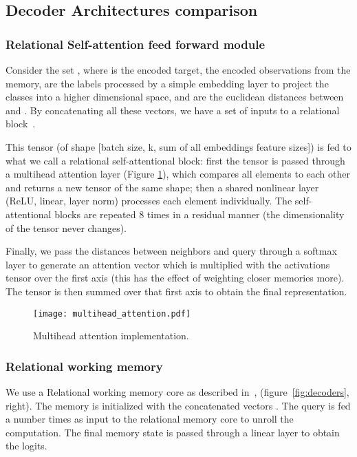 \documentclass{article} \usepackage{iclr2019_conference,times}
\begin{document}
\subsection{Decoder Architectures comparison}
\label{sec:dec_arch}

\subsubsection{Relational Self-attention feed forward module}

Consider the set , where  is the encoded target,  the encoded observations from the memory,  are the labels processed by a simple embedding layer to project the classes into a higher dimensional space, and  are the euclidean distances between  and . By concatenating all these vectors, we have a set of inputs to a relational block~\citep{battaglia2018relational}.

This tensor (of shape [batch size, k, sum of all embeddings feature sizes]) is fed to what we call a relational self-attentional block: first the tensor is passed through a multihead attention layer (Figure \ref{fig:ma_att}), which compares all elements to each other and returns a new tensor of the same shape; then a shared nonlinear layer (ReLU, linear, layer norm) processes each element individually. The self-attentional blocks are repeated 8 times in a residual manner (the dimensionality of the tensor never changes). 

Finally, we pass the distances between neighbors and query through a softmax layer to generate an attention vector which is multiplied with the activations tensor over the first axis (this has the effect of weighting closer memories more). The tensor is then summed over that first axis to obtain the final representation.

\begin{figure}[ht]
\begin{center}
\texttt{[image: multihead\_attention.pdf]}
\end{center}
\caption{Multihead attention implementation.}
\label{fig:ma_att}
\end{figure}

\subsubsection{Relational working memory}

We use a Relational working memory core as described in~\citep{santoro2018relational}, (figure~\ref{fig:decoders}, right). The memory is initialized with the concatenated vectors . The query  is fed a number  times as input to the relational memory core to unroll the computation. The final memory state is passed through a linear layer to obtain the logits. 
\end{document}
